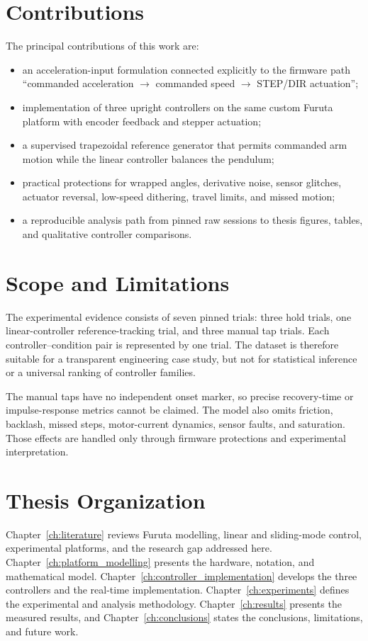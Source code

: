 \section{Contributions}
The principal contributions of this work are:
\begin{itemize}
  \item an acceleration-input formulation connected explicitly to the
  firmware path ``commanded acceleration $\rightarrow$ commanded speed
  $\rightarrow$ STEP/DIR actuation'';
  \item implementation of three upright controllers on the same custom Furuta
  platform with encoder feedback and stepper actuation;
  \item a supervised trapezoidal reference generator that permits commanded
  arm motion while the linear controller balances the pendulum;
  \item practical protections for wrapped angles, derivative noise, sensor
  glitches, actuator reversal, low-speed dithering, travel limits, and missed
  motion;
  \item a reproducible analysis path from pinned raw sessions to thesis
  figures, tables, and qualitative controller comparisons.
\end{itemize}

\section{Scope and Limitations}
The experimental evidence consists of seven pinned trials: three hold trials,
one linear-controller reference-tracking trial, and three manual tap trials.
Each controller--condition pair is represented by one trial. The dataset is
therefore suitable for a transparent engineering case study, but not for
statistical inference or a universal ranking of controller families.

The manual taps have no independent onset marker, so precise recovery-time or
impulse-response metrics cannot be claimed. The model also omits friction,
backlash, missed steps, motor-current dynamics, sensor faults, and saturation.
Those effects are handled only through firmware protections and experimental
interpretation.

\section{Thesis Organization}
Chapter~\ref{ch:literature} reviews Furuta modelling, linear and sliding-mode
control, experimental platforms, and the research gap addressed here.
Chapter~\ref{ch:platform_modelling} presents the hardware, notation, and
mathematical model. Chapter~\ref{ch:controller_implementation} develops the
three controllers and the real-time implementation. Chapter~\ref{ch:experiments}
defines the experimental and analysis methodology.
Chapter~\ref{ch:results} presents the measured results, and
Chapter~\ref{ch:conclusions} states the conclusions, limitations, and future
work.
